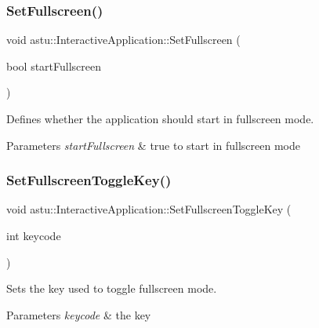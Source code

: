 \subsubsection{\texorpdfstring{Set\+Fullscreen()}{SetFullscreen()}}
{\footnotesize\ttfamily void astu\+::\+Interactive\+Application\+::\+Set\+Fullscreen (\begin{DoxyParamCaption}\item[{bool}]{start\+Fullscreen }\end{DoxyParamCaption})}

Defines whether the application should start in fullscreen mode.


\begin{DoxyParams}{Parameters}
{\em start\+Fullscreen} & {\ttfamily true} to start in fullscreen mode \\
\hline
\end{DoxyParams}
\mbox{\label{classastu_1_1InteractiveApplication_a3708c8d8673411cdb973e690f052e6e7}} 
\subsubsection{\texorpdfstring{Set\+Fullscreen\+Toggle\+Key()}{SetFullscreenToggleKey()}}
{\footnotesize\ttfamily void astu\+::\+Interactive\+Application\+::\+Set\+Fullscreen\+Toggle\+Key (\begin{DoxyParamCaption}\item[{int}]{keycode }\end{DoxyParamCaption})}

Sets the key used to toggle fullscreen mode.


\begin{DoxyParams}{Parameters}
{\em keycode} & the key \\
\hline
\end{DoxyParams}
\mbox{\label{classastu_1_1InteractiveApplication_ad79ee560819ffa161870b8dfcb5a0113}} 
